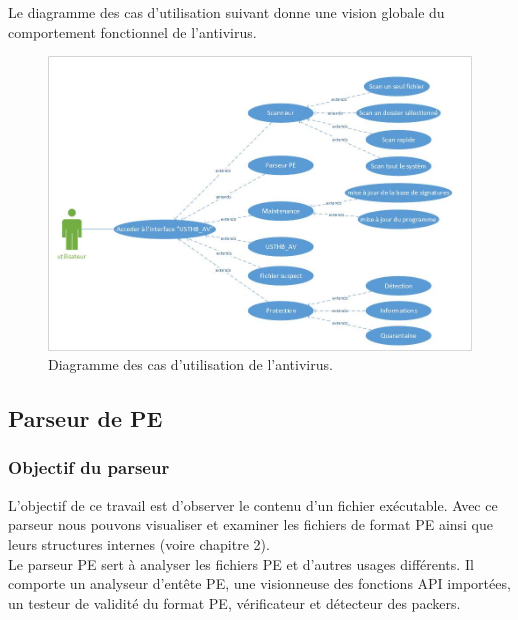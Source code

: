 Le diagramme des cas d'utilisation suivant donne une vision globale du comportement fonctionnel de l'antivirus.
\begin{figure}[H]
\begin{center}
\includegraphics[scale=0.6]{Figures/antivirus.jpg}
\caption{Diagramme des cas d'utilisation de l'antivirus.}
\label{fig :mise} 
\end{center}
\end{figure}
\subsection{Parseur de PE}
\subsubsection{Objectif du parseur }
L'objectif de ce travail est d'observer le contenu d'un fichier exécutable. Avec ce parseur nous pouvons visualiser et examiner les fichiers de format PE ainsi que leurs structures internes (voire chapitre 2).\\


Le parseur PE sert à analyser les fichiers PE et d'autres usages différents. Il comporte un analyseur d'entête PE, une visionneuse des fonctions API importées, un testeur de validité du format PE, vérificateur et détecteur des packers.
